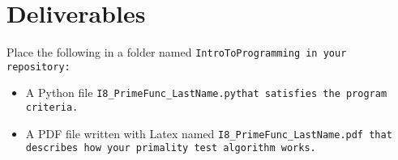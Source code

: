 \documentclass{article}
\newcommand\foldername{\tt{IntroToProgramming} }
\newcommand\filename{\tt{I8\_PrimeFunc\_LastName.py}\;\;}
\begin{document}
\section*{Deliverables}
	
	Place the following in a folder named \foldername in your repository:
	\begin{itemize}
		\item A Python file \filename  that satisfies the program criteria.
		\item A PDF file written with Latex named \tt{I8\_PrimeFunc\_LastName.pdf} that describes how your primality test algorithm works.
	\end{itemize}

	
\end{document}
